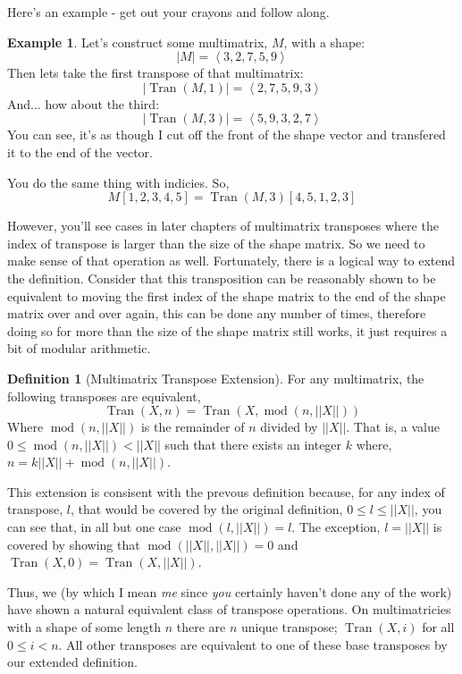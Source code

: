 \documentclass[12pt]{book}
\theoremstyle{plain}
\theoremstyle{definition}
\newtheorem{definition}{Definition}[chapter]
\newtheorem{example}{Example}[chapter]
\theoremstyle{ppart}
\theoremstyle{case}
\theoremstyle{solution}
\DeclareMathOperator{\Tran}{Tran}
\DeclareMathOperator{\remainder}{mod}
\newcommand{\shape}[1]{\left|#1\right|}
\begin{document}
Here's an example - get out your crayons and follow along.

\begin{example}
Let's construct some multimatrix, $M$, with a shape:
\[ \shape{M} = \left<3,2,7,5,9\right> \]
Then lets take the first transpose of that
multimatrix:
\[ \shape{\Tran(M, 1)} = \left<2,7,5,9,3\right> \]
And... how about the third:
\[ \shape{\Tran(M, 3)} = \left<5,9,3,2,7\right> \]
You can see, it's as though I cut off the front of the shape vector and transfered
it to the end of the vector.

You do the same thing with indicies. So,
\[ M[1,2,3,4,5] = \Tran(M, 3)[4,5,1,2,3] \]
\end{example}

However, you'll see cases in later chapters of multimatrix transposes where
the index of transpose is larger than the size of the shape matrix. So we need
to make sense of that operation as well. Fortunately, there is a logical way
to extend the definition. Consider that this transposition can be reasonably
shown to be equivalent to moving the first index of the shape matrix
to the end of the shape matrix over and over again, this can be done any number
of times, therefore doing so for more than the size of the shape matrix still works,
it just requires a bit of modular arithmetic.

\begin{definition}[Multimatrix Transpose Extension]
\label{tran_ext}
For any multimatrix, the following transposes are equivalent,
\[ \Tran(X, n) = \Tran(X, \remainder(n, \shape{\shape{X}})) \]
Where $\remainder(n, \shape{\shape{X}})$ is the remainder of $n$ divided by $\shape{\shape{X}}$.
That is, a value $0 \le \remainder(n, \shape{\shape{X}}) < \shape{\shape{X}}$ such that there exists an
integer $k$ where, $n = k\shape{\shape{X}} + \remainder(n, \shape{\shape{X}})$.
\end{definition}

This extension is consisent with the prevous definition because, for any
index of transpose, $l$, that would be covered by the original definition,
$0 \le l \le \shape{\shape{X}}$, you can see that, in all but one case $\remainder(l, \shape{\shape{X}}) = l$.
The exception, $l = \shape{\shape{X}}$ is covered by showing that
$\remainder(\shape{\shape{X}}, \shape{\shape{X}}) = 0$ and $\Tran(X, 0) = \Tran(X, \shape{\shape{X}})$. 

Thus, we (by which I mean \textit{me} since \textit{you} certainly haven't done any
of the work) have shown a natural equivalent class \cite{book:abstract} of transpose
operations. On multimatricies with a shape of some length $n$ there are $n$ unique
transpose; $\Tran(X, i)$ for all $0 \le i < n$. All other transposes are equivalent
to one of these base transposes by our extended definition.
\end{document}
